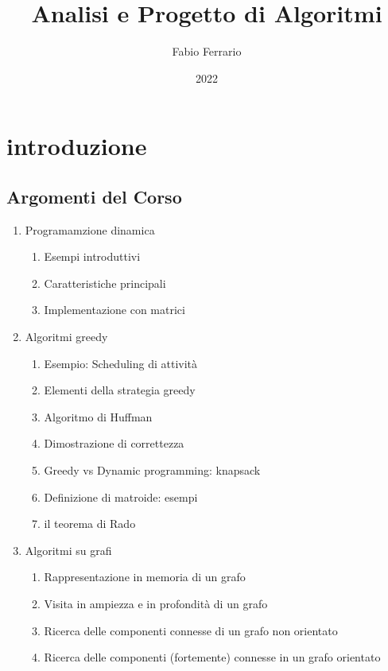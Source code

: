 \documentclass[12pt, a4paper, openany]{book}
\begin{document}
\title{Analisi e Progetto di Algoritmi}
\author{Fabio Ferrario}
\date{2022}
\maketitle

\tableofcontents

\chapter{introduzione}
\section{Argomenti del Corso}
\begin{enumerate}
    \item Programamzione dinamica
          \begin{enumerate}
              \item Esempi introduttivi
              \item Caratteristiche principali
              \item Implementazione con matrici
          \end{enumerate}
    \item Algoritmi greedy
          \begin{enumerate}
              \item Esempio: Scheduling di attività
              \item Elementi della strategia greedy
              \item Algoritmo di Huffman
              \item Dimostrazione di correttezza
              \item Greedy vs Dynamic programming: knapsack
              \item Definizione di matroide: esempi
              \item il teorema di Rado
          \end{enumerate}
    \item Algoritmi su grafi
          \begin{enumerate}
              \item Rappresentazione in memoria di un grafo
              \item Visita in ampiezza e in profondità di un grafo
              \item Ricerca delle componenti connesse di un grafo non orientato
              \item Ricerca delle componenti (fortemente) connesse in un grafo orientato

\end{enumerate}
\end{enumerate}
\end{document}
